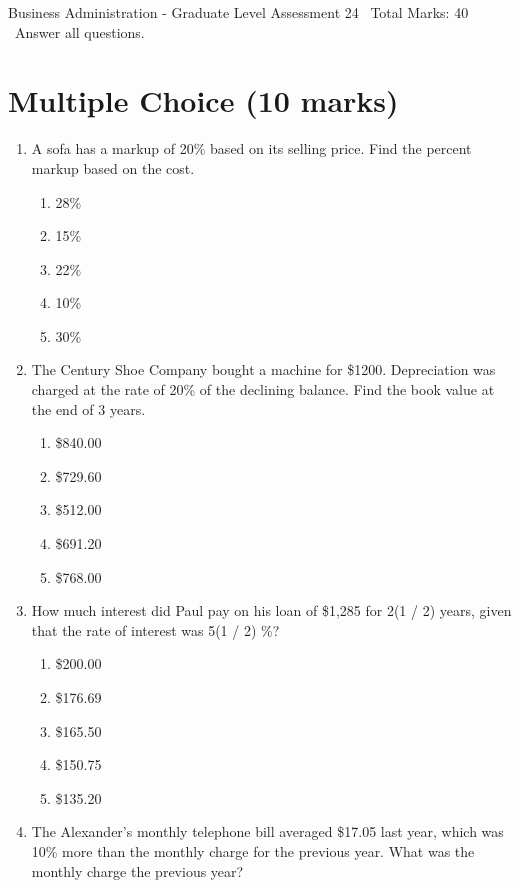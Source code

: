 \documentclass[12pt]{article}
\begin{document}
\begin{center}
Business Administration - Graduate Level Assessment 24 \
Total Marks: 40 \
Answer all questions.
\end{center}

\section*{Multiple Choice (10 marks)}
\begin{enumerate}[label=\arabic*.]
\item A sofa has a markup of 20\% based on its selling price. Find the percent markup based on the cost.
\begin{enumerate}[label=(\alph*)]
    \item 28\%
    \item 15\%
    \item 22\%
    \item 10\%
    \item 30\%
\end{enumerate}
\item The Century Shoe Company bought a machine for \$1200. Depreciation was charged at the rate of 20\% of the declining balance. Find the book value at the end of 3 years.
\begin{enumerate}[label=(\alph*)]
    \item \$840.00
    \item \$729.60
    \item \$512.00
    \item \$691.20
    \item \$768.00
\end{enumerate}
\item How much interest did Paul pay on his loan of \$1,285 for 2(1 / 2) years, given that the rate of interest was 5(1 / 2) \%?
\begin{enumerate}[label=(\alph*)]
    \item \$200.00
    \item \$176.69
    \item \$165.50
    \item \$150.75
    \item \$135.20
\end{enumerate}
\item The Alexander's monthly telephone bill averaged \$17.05 last year, which was 10\% more than the monthly charge for the previous year. What was the monthly charge the previous year?
\begin{enumerate}[label=(\alph*)]

\end{enumerate}
\end{enumerate}
\end{document}
